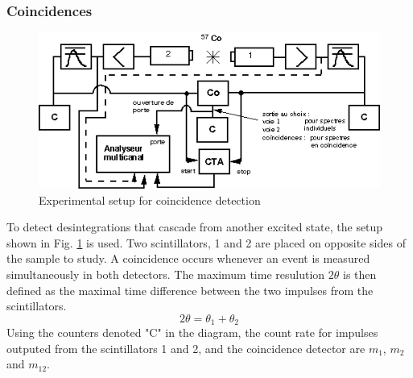 \subsubsection{Coincidences}
\begin{figure}[h]
    \centering
    \includegraphics[width=\textwidth]{figures/coincidences.png}
    \caption{Experimental setup for coincidence detection \cite{notice_VI}}
    \label{fig:setup_coincidences}
\end{figure}

To detect desintegrations that cascade from another excited state, the setup shown in Fig. \ref{fig:setup_coincidences} is used. Two scintillators, 1 and 2 are placed on opposite sides of the sample to study. A coincidence occurs whenever an event is measured simultaneously in both detectors. The maximum time resulution \(2 \theta\) is then defined as the maximal time difference between the two impulses from the scintillators.
\begin{equation}
    2 \theta = \theta_1 + \theta_{2}
\end{equation}
Using the counters denoted "C" in the diagram, the count rate for impulses outputed from the scintillators 1 and 2, and the coincidence detector are \(m_1\), \(m_2\) and \(m_{12}\). 

